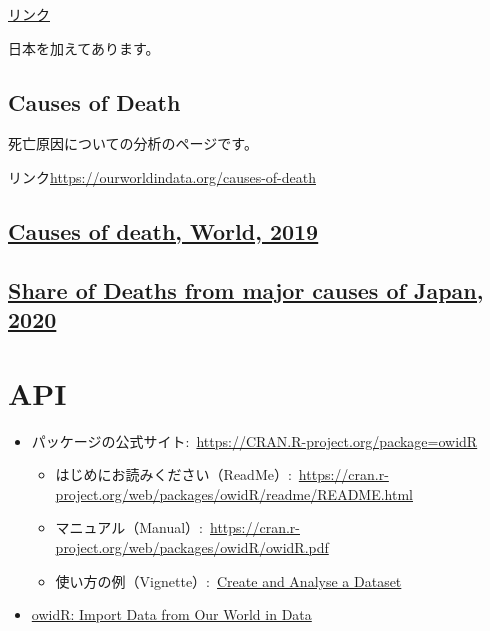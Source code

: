 \documentclass[
  xelatex, ja=standard]{bxjsbook}
\theoremstyle{definition}
\theoremstyle{definition}
\theoremstyle{definition}
\theoremstyle{definition}
\theoremstyle{remark}
\begin{document}
\href{https://ourworldindata.org/explorers/coronavirus-data-explorer?zoomToSelection=true\&time=2020-03-01..latest\&facet=none\&country=USA~GBR~CAN~DEU~ITA~IND\&pickerSort=asc\&pickerMetric=location\&Metric=Confirmed+cases\&Interval=7-day+rolling+average\&Relative+to+Population=true\&Color+by+test+positivity=false}{リンク}

日本を加えてあります。

\hypertarget{causes-of-death}{%
\subsection{\texorpdfstring{\textbf{Causes of Death}}{Causes of Death}}\label{causes-of-death}}

死亡原因についての分析のページです。

リンク\url{https://ourworldindata.org/causes-of-death}

\hypertarget{causes-of-death-world-2019}{%
\subsection{\texorpdfstring{\href{https://ourworldindata.org/grapher/annual-number-of-deaths-by-cause}{Causes of death, World, 2019}}{Causes of death, World, 2019}}\label{causes-of-death-world-2019}}

\hypertarget{share-of-deaths-from-major-causes-of-japan-2020}{%
\subsection{\texorpdfstring{\href{https://ourworldindata.org/grapher/share-of-deaths-from-major-causes?country=~JPN}{Share of Deaths from major causes of Japan, 2020}}{Share of Deaths from major causes of Japan, 2020}}\label{share-of-deaths-from-major-causes-of-japan-2020}}

\hypertarget{api-3}{%
\section{API}\label{api-3}}

\begin{itemize}
\item
  パッケージの公式サイト:~\href{https://cran.r-project.org/package=owidR}{https://CRAN.R-project.org/package=owidR}

  \begin{itemize}
  \item
    はじめにお読みください（ReadMe）:~\url{https://cran.r-project.org/web/packages/owidR/readme/README.html}
  \item
    マニュアル（Manual）:~\url{https://cran.r-project.org/web/packages/owidR/owidR.pdf}
  \item
    使い方の例（Vignette）:~\href{https://cran.r-project.org/web/packages/owidR/vignettes/example-analysis.html}{Create and Analyse a Dataset}
  \end{itemize}
\item
  \href{https://rdrr.io/cran/owidR/}{owidR: Import Data from Our World in Data}
\end{itemize}
\end{document}
